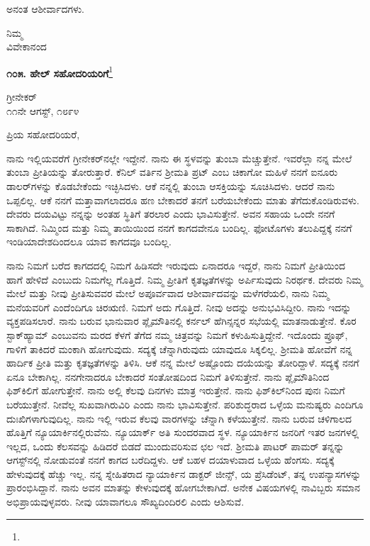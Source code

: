 ಅನಂತ ಆಶೀರ್ವಾದಗಳು.

\vspace{-0.5cm}

{\flushright
ನಿಮ್ಮ\\ವಿವೇಕಾನಂದ\par}

\begin{center}
\textbf{೧೦೫. ಹೇಲ್ ಸಹೋದರಿಯರಿಗೆ}\footnote{}
\end{center}

\vspace{-0.5cm}

\begin{flushright}
ಗ್ರೀನೇಕರ್‌\\೧೧ನೇ ಆಗಸ್ಟ್, ೧೮೯೪
\end{flushright}

\vspace{-0.5cm}

\noindent
ಪ್ರಿಯ ಸಹೋದರಿಯರೆ,

ನಾನು ಇಲ್ಲಿಯವರೆಗೆ ಗ್ರೀನೇಕರ್‌ನಲ್ಲೇ ಇದ್ದೇನೆ. ನಾನು ಈ ಸ್ಥಳವನ್ನು ತುಂಬಾ ಮೆಚ್ಚುತ್ತೇನೆ. ಇವರೆಲ್ಲಾ ನನ್ನ ಮೇಲೆ ತುಂಬಾ ಪ್ರೀತಿಯನ್ನು ತೋರುತ್ತಾರೆ. ಕೆನಿಲ್ ವರ್ತಿನ ಶ‍್ರೀಮತಿ ಪ್ರಟ್ ಎಂಬ ಚಿಕಾಗೋ ಮಹಿಳೆ ನನಗೆ ಐನೂರು ಡಾಲರ್‌ಗಳನ್ನು ಕೊಡಬೇಕೆಂದು ಇಚ್ಛಿಸಿದಳು. ಆಕೆ ನನ್ನಲ್ಲಿ ತುಂಬಾ ಆಸಕ್ತಿಯನ್ನು ಸೂಚಿಸಿದಳು. ಆದರೆ ನಾನು ಒಪ್ಪಲಿಲ್ಲ. ಆಕೆ ನನಗೆ ಮತ್ತಾವಾಗಲಾದರೂ ಹಣ ಬೇಕಾದರೆ ತನಗೆ ಬರೆಯಬೇಕೆಂದು ಮಾತು ತೆಗೆದುಕೊಂಡಿರುವಳು. ದೇವರು ದಯವಿಟ್ಟು ನನ್ನನ್ನು ಅಂತಹ ಸ್ಥಿತಿಗೆ ತರಲಾರ ಎಂದು ಭಾವಿಸುತ್ತೇನೆ. ಅವನ ಸಹಾಯ ಒಂದೇ ನನಗೆ ಸಾಕಾಗಿದೆ. ನಿಮ್ಮಿಂದ ಮತ್ತು ನಿಮ್ಮ ತಾಯಿಯಿಂದ ನನಗೆ ಕಾಗದವೇನೂ ಬಂದಿಲ್ಲ. ಫೋಟೊಗಳು ತಲುಪಿದ್ದಕ್ಕೆ ನನಗೆ ಇಂಡಿಯಾದೇಶದಿಂದಲೂ ಯಾವ ಕಾಗದವೂ ಬಂದಿಲ್ಲ.

ನಾನು ನಿಮಗೆ ಬರೆದ ಕಾಗದದಲ್ಲಿ ನಿಮಗೆ ಹಿಡಿಸದೇ ಇರುವುದು ಏನಾದರೂ ಇದ್ದರೆ, ನಾನು ನಿಮಗೆ ಪ್ರೀತಿಯಿಂದ ಹಾಗೆ ಹೇಳಿದೆ ಎಂಬುದು ನಿಮಗೆಲ್ಲ ಗೊತ್ತಿದೆ. ನಿಮ್ಮ ಪ್ರೀತಿಗೆ ಕೃತಜ್ಞತೆಗಳನ್ನು ಅರ್ಪಿಸುವುದು ನಿರರ್ಥಕ. ದೇವರು ನಿಮ್ಮ ಮೇಲೆ ಮತ್ತು ನೀವು ಪ್ರೀತಿಸುವವರ ಮೇಲೆ ಅಪೂರ್ವವಾದ ಆಶೀರ್ವಾದವನ್ನು ಮಳೆಗರೆಯಲಿ, ನಾನು ನಿಮ್ಮ ಮನೆಯವರಿಗೆ ಎಂದೆಂದಿಗೂ ಚಿರಋಣಿ. ನಿಮಗೆ ಅದು ಗೊತ್ತಿದೆ. ನೀವು ಅದನ್ನು ಅನುಭವಿಸಿದ್ದೀರಿ. ನಾನು ಇದನ್ನು ವ್ಯಕ್ತಪಡಿಸಲಾರೆ. ನಾನು ಬರುವ ಭಾನುವಾರ ಪ್ಲೈಮೌತಿನಲ್ಲಿ ಕರ್ನಲ್ ಹೆಗಿನ್ಸನ್ನರ  ಸಭೆಯಲ್ಲಿ ಮಾತನಾಡುತ್ತೇನೆ. ಕೊರ ಸ್ಟಾಕ್‌ಹ್ಯಾಮ್ ಎಂಬುವನು ಮರದ ಕೆಳಗೆ ತೆಗೆದ ನಮ್ಮ ಚಿತ್ರವನ್ನು ನಿಮಗೆ ಕಳುಹಿಸುತ್ತಿದ್ದೇನೆ. ಇದೊಂದು ಪ್ರೂಫ್, ಗಾಳಿಗೆ ತಾಕಿದರೆ ಮಂಕಾಗಿ ಹೋಗುವುದು. ಸದ್ಯಕ್ಕೆ ಚೆನ್ನಾಗಿರುವುದು ಯಾವುದೂ ಸಿಕ್ಕಲಿಲ್ಲ. ಶ‍್ರೀಮತಿ ಹೋವೆಗೆ ನನ್ನ ಹಾರ್ದಿಕ ಪ್ರೀತಿ ಮತ್ತು ಕೃತಜ್ಞತೆಗಳನ್ನು ತಿಳಿಸಿ. ಆಕೆ ನನ್ನ ಮೇಲೆ ಅಷ್ಟೊಂದು ದಯೆಯನ್ನು ತೋರಿದ್ದಾಳೆ. ಸದ್ಯಕ್ಕೆ ನನಗೆ ಏನೂ ಬೇಕಾಗಿಲ್ಲ. ನನಗೇನಾದರೂ ಬೇಕಾದರೆ ಸಂತೋಷದಿಂದ ನಿಮಗೆ ತಿಳಿಸುತ್ತೇನೆ. ನಾನು ಪ್ಲೈಮೌತಿನಿಂದ ಫಿಶ್‌ಕಿಲಿಗೆ ಹೋಗುತ್ತೇನೆ. ನಾನು ಅಲ್ಲಿ ಕೆಲವು ದಿನಗಳು ಮಾತ್ರ ಇರುತ್ತೇನೆ. ನಾನು ಫಿಶ್‌ಕಿಲ್‌ನಿಂದ ಪುನಃ ನಿಮಗೆ ಬರೆಯುತ್ತೇನೆ. ನೀವೆಲ್ಲ ಸುಖವಾಗಿರುವಿರಿ ಎಂದು ನಾನು ಭಾವಿಸುತ್ತೇನೆ. ಪರಿಶುದ್ಧರಾದ ಒಳ್ಳೆಯ ಮನುಷ್ಯರು ಎಂದಿಗೂ ದುಃಖಿಗಳಾಗುವುದಿಲ್ಲ. ನಾನು ಇಲ್ಲಿ ಇರುವ ಕೆಲವು ವಾರಗಳನ್ನು ಚೆನ್ನಾಗಿ ಕಳೆಯುತ್ತೇನೆ. ನಾನು ಬರುವ ಚಳಿಗಾಲದ ಹೊತ್ತಿಗೆ ನ್ಯೂಯಾರ್ಕಿನಲ್ಲಿರುವೆನು. ನ್ಯೂಯಾರ್ಕ್ ಅತಿ ಸುಂದರವಾದ ಸ್ಥಳ. ನ್ಯೂಯಾರ್ಕಿನ ಜನರಿಗೆ ಇತರ ಜನಗಳಲ್ಲಿ ಇಲ್ಲದ, ಒಂದು ಕೆಲಸವನ್ನು ಹಿಡಿದರೆ ಬಿಡದೆ ಮುಂದುವರಿಸುವ ಛಲ ಇದೆ. ಶ‍್ರೀಮತಿ ಪಾಟರ್ ಪಾಮರ್‌ ತನ್ನನ್ನು ಆಗಸ್ಟ್‌ನಲ್ಲಿ ನೋಡುವಂತೆ ನನಗೆ ಕಾಗದ ಬರೆದಿದ್ದಳು. ಆಕೆ ಬಹಳ ದಯಾಳುವಾದ ಒಳ್ಳೆಯ ಹೆಂಗಸು. ಸದ್ಯಕ್ಕೆ ಹೇಳುವುದಕ್ಕೆ ಹೆಚ್ಚು ಇಲ್ಲ. ನನ್ನ ಸ್ನೇಹಿತರಾದ ನ್ಯಾಯಾರ್ಕಿನ ಡಾಕ್ಟರ್ ಜೀನ್ಸ್,  ಯ ಪ್ರೆಸಿಡೆಂಟ್, ತನ್ನ ಉಪನ್ಯಾಸಗಳನ್ನು ಪ್ರಾರಂಭಿಸಿದ್ದಾನೆ. ನಾನು ಅವನ ಮಾತನ್ನು ಕೇಳುವುದಕ್ಕೆ ಹೋಗಬೇಕಾಗಿದೆ. ಅನೇಕ ವಿಷಯಗಳಲ್ಲಿ ನಾವಿಬ್ಬರು ಸಮಾನ ಅಭಿಪ್ರಾಯವುಳ್ಳವರು. ನೀವು ಯಾವಾಗಲೂ ಸೌಖ್ಯದಿಂದಿರಲಿ ಎಂದು ಆಶಿಸುವೆ.


